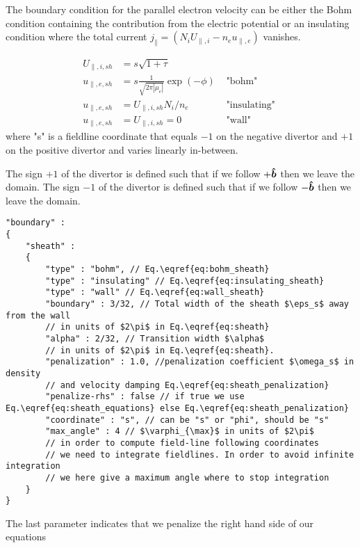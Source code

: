The boundary condition for the parallel electron velocity can be either the Bohm condition containing the contribution from the electric potential or
an insulating condition where the total current $j_\parallel =  (N_i U_{\parallel,i} - n_e u_{\parallel,e})$ vanishes.

\begin{align}
    U_{\parallel,i, sh} &= s\sqrt{1+\tau} \\
    u_{\parallel,e, sh} &= s\frac{1}{\sqrt{2\pi|\mu_e|}}\exp(-\phi) &\text{ "bohm" } \label{eq:bohm_sheath}\\
    u_{\parallel,e, sh} &= U_{\parallel,i,sh}N_i/n_e &\text{ "insulating" } \label{eq:insulating_sheath} \\
    u_{\parallel,e, sh} &= U_{\parallel,i,sh} = 0 &\text{ "wall" } \label{eq:wall_sheath}
\end{align}
where "s" is a fieldline coordinate that equals $-1$ on the negative divertor and $+1$ on the positive divertor
and varies linearly in-between.
\begin{tcolorbox}[title=Note]
    The sign $+1$ of the divertor is defined such that if we follow $+\bm{\hat{b}}$
    then we leave the domain.
    The sign $-1$ of the divertor is defined such that if we follow $-\bm{\hat{b}}$
    then we leave the domain.
\end{tcolorbox}
\begin{verbatim}
"boundary" :
{
    "sheath" :
    {
        "type" : "bohm", // Eq.\eqref{eq:bohm_sheath}
        "type" : "insulating" // Eq.\eqref{eq:insulating_sheath}
        "type" : "wall" // Eq.\eqref{eq:wall_sheath}
        "boundary" : 3/32, // Total width of the sheath $\eps_s$ away from the wall
        // in units of $2\pi$ in Eq.\eqref{eq:sheath}
        "alpha" : 2/32, // Transition width $\alpha$
        // in units of $2\pi$ in Eq.\eqref{eq:sheath}.
        "penalization" : 1.0, //penalization coefficient $\omega_s$ in density
        // and velocity damping Eq.\eqref{eq:sheath_penalization}
        "penalize-rhs" : false // if true we use Eq.\eqref{eq:sheath_equations} else Eq.\eqref{eq:sheath_penalization}
        "coordinate" : "s", // can be "s" or "phi", should be "s"
        "max_angle" : 4 // $\varphi_{\max}$ in units of $2\pi$
        // in order to compute field-line following coordinates
        // we need to integrate fieldlines. In order to avoid infinite integration
        // we here give a maximum angle where to stop integration
    }
}
\end{verbatim}
\noindent
The last parameter indicates that we penalize the right hand side of our equations
